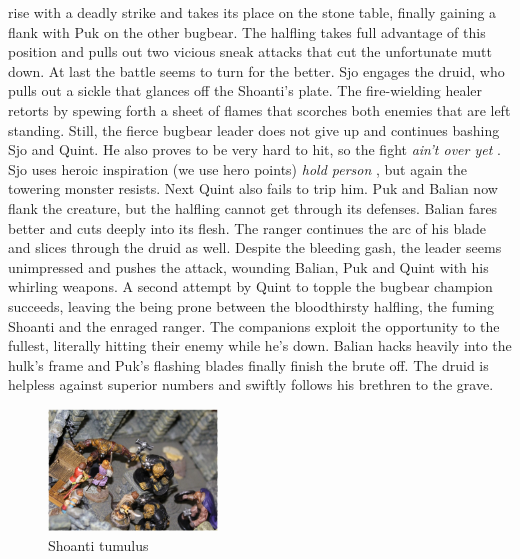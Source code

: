 rise with a deadly strike and takes its place on the stone table, finally gaining a flank with Puk on the other bugbear. The halfling takes full advantage of this position and pulls out two vicious sneak attacks that cut the unfortunate mutt down. At last the battle seems to turn for the better. Sjo engages the druid, who pulls out a sickle that glances off the Shoanti's plate. The fire-wielding healer retorts by spewing forth a sheet of flames that scorches both enemies that are left standing. Still, the fierce bugbear leader does not give up and continues bashing Sjo and Quint. He also proves to be very hard to hit, so the fight  {\itshape ain't over yet} . Sjo uses heroic inspiration (we use hero points)  {\itshape hold person} , but again the towering monster resists. Next Quint also fails to trip him. Puk and Balian now flank the creature, but the halfling cannot get through its defenses. Balian fares better and cuts deeply into its flesh. The ranger continues the arc of his blade and slices through the druid as well. Despite the bleeding gash, the leader seems unimpressed and pushes the attack, wounding Balian, Puk and Quint with his whirling weapons. A second attempt by Quint to topple the bugbear champion succeeds, leaving the being prone between the bloodthirsty halfling, the fuming Shoanti and the enraged ranger. The companions exploit the opportunity to the fullest, literally hitting their enemy while he's down. Balian hacks heavily into the hulk's frame and Puk's flashing blades finally finish the brute off. The druid is helpless against superior numbers and swiftly follows his brethren to the grave. \\

\begin{figure}[h]
	\centering
	\includegraphics[width=0.4\textwidth]{images/Shoanti-tumulus-475539806_mod.jpg}
	\caption{Shoanti tumulus}
	\label{fig:Shoanti-tumulus-475539806}
\end{figure}

